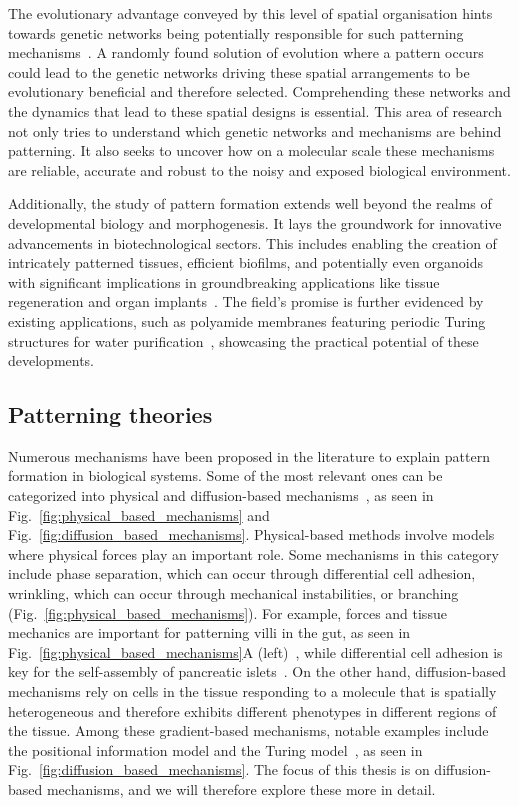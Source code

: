 The evolutionary advantage conveyed by this level of spatial organisation hints towards genetic networks being potentially responsible for such patterning mechanisms~\parencite{caro2005adaptive}.
A randomly found solution of evolution where a pattern occurs could lead to the genetic networks driving these spatial arrangements to be evolutionary beneficial and therefore selected. %
Comprehending these networks and the dynamics that lead to these spatial designs is essential.
This area of research not only tries to understand which genetic networks and mechanisms are behind patterning.
It also seeks to uncover how on a molecular scale these mechanisms are reliable, accurate and robust to the noisy and exposed biological environment.

Additionally, the study of pattern formation extends well beyond the realms of developmental biology and morphogenesis.
It lays the groundwork for innovative advancements in biotechnological sectors.
This includes enabling the creation of intricately patterned tissues, efficient biofilms, and potentially even organoids with significant implications in groundbreaking applications like tissue regeneration and organ implants~\parencite{Scholes2017}.
The field's promise is further evidenced by existing applications, such as polyamide membranes featuring periodic Turing structures for water purification~\parencite{Tan2018}, showcasing the practical potential of these developments.

\subsection{Patterning theories}
Numerous mechanisms have been proposed in the literature to explain pattern formation in biological systems.
Some of the most relevant ones can be categorized into physical and diffusion-based mechanisms~\parencite{hiscock2015mathematically, Scholes2017}, as seen in Fig.~\ref{fig:physical_based_mechanisms} and Fig.~\ref{fig:diffusion_based_mechanisms}.
Physical-based methods involve models where physical forces play an important role.
Some mechanisms in this category include phase separation, which can occur through differential cell adhesion, wrinkling, which can occur through mechanical instabilities, or branching (Fig.~\ref{fig:physical_based_mechanisms}).
For example, forces and tissue mechanics are important for patterning villi in the gut, as seen in Fig.~\ref{fig:physical_based_mechanisms}A (left)~\parencite{shyer2013villification}, while differential cell adhesion is key for the self-assembly of pancreatic islets~\parencite{jia2007tissue}.
On the other hand, diffusion-based mechanisms rely on cells in the tissue responding to a molecule that is spatially heterogeneous and therefore exhibits different phenotypes in different regions of the tissue.
Among these gradient-based mechanisms, notable examples include the positional information model and the Turing model~\parencite{Wolpert1969, Turing1952}, as seen in Fig.~\ref{fig:diffusion_based_mechanisms}.
The focus of this thesis is on diffusion-based mechanisms, and we will therefore explore these more in detail.

